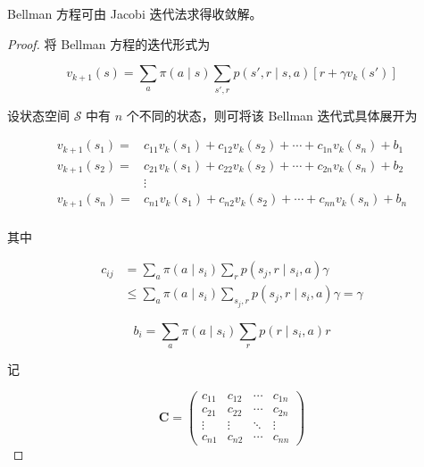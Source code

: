 \begin{Theorem}\label{the:bellmanjacobi}
    Bellman 方程可由 Jacobi 迭代法求得收敛解。
\end{Theorem}

\begin{proof}

将 Bellman 方程的迭代形式为

\begin{equation}\label{eq:itebellman}
    v_{k+1}(s) = \sum_a\pi(a\mid s)\sum_{s',r}p(s',r \mid s,a)[r+\gamma v_k(s')]
\end{equation}

设状态空间 $\mathcal S$ 中有 $n$ 个不同的状态，则可将该 Bellman 迭代式具体展开为

\begin{equation}
    \begin{aligned}
        v_{k+1}(s_1)=&c_{11}v_k(s_1)+c_{12}v_k(s_2)+\cdots+c_{1n}v_k(s_n)+b_1\\
        v_{k+1}(s_2)= & c_{21}v_k(s_1)+c_{22}v_k(s_2)+\cdots+c_{2n}v_k(s_n)+b_2\\
        &\vdots\\
        v_{k+1}(s_n)= & c_{n1}v_k(s_1)+c_{n2}v_k(s_2)+\cdots+c_{nn}v_k(s_n)+b_n\\
        \end{aligned}
\end{equation}

其中

\begin{equation}
    \begin{aligned}
        c_{ij} &=\sum_a\pi(a\mid s_i)\sum_{r}p(s_j,r \mid s_i,a)\gamma\\
        &\leq \sum_a\pi(a\mid s_i)\sum_{s_j,r}p(s_j,r \mid s_i,a)\gamma=\gamma
    \end{aligned}
\end{equation}

\begin{equation}
    b_{i} =\sum_a\pi(a\mid s_i)\sum_{r}p(r\mid s_i,a)r
\end{equation}

记

\begin{equation}
    \boldsymbol{C} =
    \left(\begin{array}{cccc}
    c_{11} & c_{12} & \cdots & c_{1n} \\
    c_{21} & c_{22} & \cdots & c_{2n} \\
    \vdots & \vdots & \ddots & \vdots \\
    c_{n1} & c_{n2} & \cdots & c_{nn}
    \end{array}\right)
\end{equation}


\end{proof}
